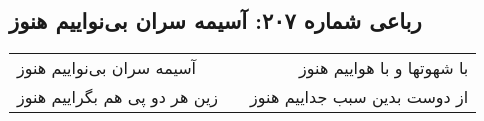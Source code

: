 \begin{center}
\section*{رباعی شماره ۲۰۷: آسیمه سران بی‌نواییم هنوز}
\label{sec:sh207}
\begin{longtable}{l p{0.5cm} r}
آسیمه سران بی‌نواییم هنوز
&&
با شهوتها و با هواییم هنوز
\\
زین هر دو پی هم بگراییم هنوز
&&
از دوست بدین سبب جداییم هنوز
\\
\end{longtable}
\end{center}
